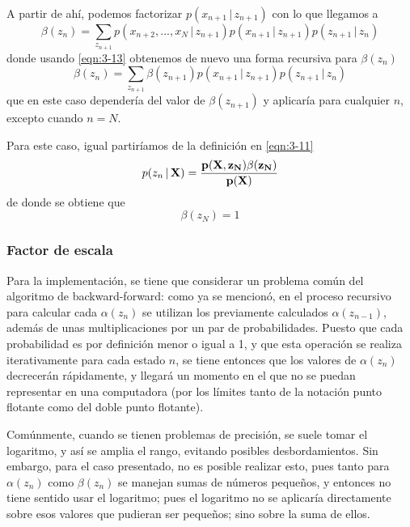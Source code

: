 A partir de ahí, podemos factorizar $p(x_{n+1} \,|\, z_{n+1})$ con lo que llegamos a 
\begin{equation}  
  \beta(z_n) = \sum_{z_{n+1}} p(x_{n+2}, ..., x_N \,|\, z_{n+1}) 
    p(x_{n+1} \,|\, z_{n+1}) p(z_{n+1} \,|\, z_n)    
    \label{eqn:3-17}
\end{equation}
donde usando \eqref{eqn:3-13} obtenemos de nuevo una forma recursiva para $\beta(z_n)$
\begin{equation}  
  \beta(z_n) = \sum_{z_{n+1}} \beta(z_{n+1})
    p(x_{n+1} \,|\, z_{n+1}) p(z_{n+1} \,|\, z_n)    
    \label{eqn:3-18}
\end{equation}
que en este caso dependería del valor de $\beta(z_{n+1})$ y aplicaría para cualquier $n$, excepto cuando $n = N$. 

Para este caso, igual partiríamos de la definición en \eqref{eqn:3-11}
\begin{equation}
  p(z_n \,|\, \bf{X}) = \frac{p(\bf{X}, z_N) \beta(z_N)} {p(\bf{X})}
  \label{eqn:3-19}
\end{equation}
de donde se obtiene que 
\begin{equation}
  \beta(z_N) = 1
  \label{eqn:3-20}
\end{equation}

\subsubsection{Factor de escala}
\label{sec:escala}

Para la implementación, se tiene que considerar un problema común del algoritmo de backward-forward: como ya se mencionó, en el proceso recursivo para calcular cada $\alpha(z_n)$ se utilizan los previamente calculados $\alpha(z_{n-1})$, además de unas multiplicaciones por un par de probabilidades. Puesto que cada probabilidad es por definición menor o igual a 1, y que esta operación se realiza iterativamente para cada estado $n$, se tiene entonces que los valores de $\alpha(z_n)$ decrecerán rápidamente, y llegará un momento en el que no se puedan representar en una computadora (por los límites tanto de la notación punto flotante como del doble punto flotante).

Comúnmente, cuando se tienen problemas de precisión, se suele tomar el logaritmo, y así se amplia el rango, evitando posibles desbordamientos. Sin embargo, para el caso presentado, no es posible realizar esto, pues tanto para $\alpha(z_n)$ como $\beta(z_n)$ se manejan sumas de números pequeños, y entonces no tiene sentido usar el logaritmo; pues el logaritmo no se aplicaría directamente sobre esos valores que pudieran ser pequeños; sino sobre la suma de ellos.


